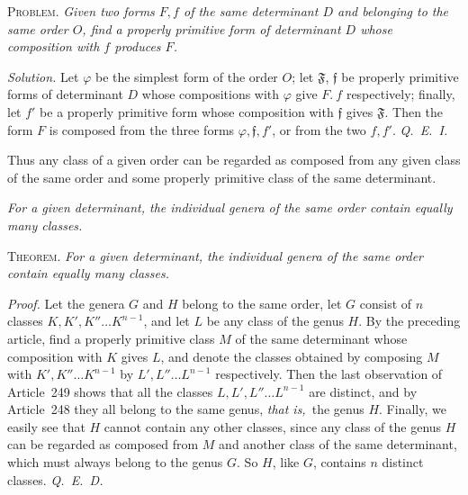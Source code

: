 \textsc{Problem.} \textit{Given two forms $F,f$ of the same determinant $D$ and belonging to the same order $O$, find a properly primitive form of determinant $D$ whose composition with $f$ produces $F$.}

\textit{Solution.} Let $\varphi$ be the simplest form of the order $O$; let $\mathfrak{F}$, $\mathfrak{f}$ be properly primitive forms of determinant $D$ whose compositions with $\varphi$ give $F.\ f$ respectively; finally, let $f'$ be a properly primitive form whose composition with $\mathfrak{f}$ gives $\mathfrak{F}$. Then the form $F$ is composed from the three forms $\varphi,\mathfrak{f},f'$, or from the two $f,f'$. \textit{Q.~E.~I.}

Thus any class of a given order can be regarded as composed from any given class of the same order and some properly primitive class of the same determinant.

\begin{center}
\textit{For a given determinant, the individual genera of the same order contain equally many classes.}
\end{center}

\textsc{Theorem.} \textit{For a given determinant, the individual genera of the same order contain equally many classes.}

\textit{Proof.} Let the genera $G$ and $H$ belong to the same order, let $G$ consist of $n$ classes $K,K',K''\ldots K^{n-1}$, and let $L$ be any class of the genus $H$. By the preceding article, find a properly primitive class $M$ of the same determinant whose composition with $K$ gives $L$, and denote the classes obtained by composing $M$ with $K',K''\ldots K^{n-1}$ by $L',L''\ldots L^{n-1}$ respectively. Then the last observation of Article~249 shows that all the classes $L,L',L''\ldots L^{n-1}$ are distinct, and by Article~248 they all belong to the same genus, \textit{that is,}\ the genus $H$. Finally, we easily see that $H$ cannot contain any other classes, since any class of the genus $H$ can be regarded as composed from $M$ and another class of the same determinant, which must always belong to the genus $G$. So $H$, like $G$, contains $n$ distinct classes. \textit{Q.~E.~D.}
